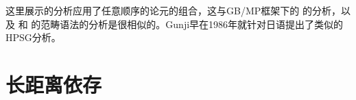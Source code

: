 
这里展示的分析应用了任意顺序的论元的组合，这与GB/MP框架下的 \citet{Fanselow2001a}的分析，以及 \citet[\S~3.1]{Hoffmann95a-u}和 \citet{SB2006a-u}的范畴语法的分析是很相似的。Gunji\nocite{Gunji86a}早在1986年就针对日语提出了类似的HPSG分析。

\section{长距离依存}
\label{Abschnitt-Fernabhängigkeiten-HPSG}\label{sec-nld-HPSG}

